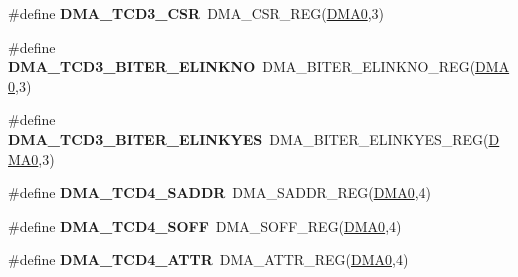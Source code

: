 \begin{DoxyCompactItemize}
\item 
\#define {\bfseries D\+M\+A\+\_\+\+T\+C\+D3\+\_\+\+C\+SR}~D\+M\+A\+\_\+\+C\+S\+R\+\_\+\+R\+EG(\hyperlink{group__DMA__Peripheral__Access__Layer_ga4103044f9ca209772f513dc694513ffb}{D\+M\+A0},3)\hypertarget{group__DMA__Register__Accessor__Macros_ga4cd4b37d23c6c4cd59c8e75abc49a620}{}\label{group__DMA__Register__Accessor__Macros_ga4cd4b37d23c6c4cd59c8e75abc49a620}

\item 
\#define {\bfseries D\+M\+A\+\_\+\+T\+C\+D3\+\_\+\+B\+I\+T\+E\+R\+\_\+\+E\+L\+I\+N\+K\+NO}~D\+M\+A\+\_\+\+B\+I\+T\+E\+R\+\_\+\+E\+L\+I\+N\+K\+N\+O\+\_\+\+R\+EG(\hyperlink{group__DMA__Peripheral__Access__Layer_ga4103044f9ca209772f513dc694513ffb}{D\+M\+A0},3)\hypertarget{group__DMA__Register__Accessor__Macros_ga3b8e5cd5463badcff9d9de63e01ba131}{}\label{group__DMA__Register__Accessor__Macros_ga3b8e5cd5463badcff9d9de63e01ba131}

\item 
\#define {\bfseries D\+M\+A\+\_\+\+T\+C\+D3\+\_\+\+B\+I\+T\+E\+R\+\_\+\+E\+L\+I\+N\+K\+Y\+ES}~D\+M\+A\+\_\+\+B\+I\+T\+E\+R\+\_\+\+E\+L\+I\+N\+K\+Y\+E\+S\+\_\+\+R\+EG(\hyperlink{group__DMA__Peripheral__Access__Layer_ga4103044f9ca209772f513dc694513ffb}{D\+M\+A0},3)\hypertarget{group__DMA__Register__Accessor__Macros_ga78fb2452c2df35600818d0dc072bb308}{}\label{group__DMA__Register__Accessor__Macros_ga78fb2452c2df35600818d0dc072bb308}

\item 
\#define {\bfseries D\+M\+A\+\_\+\+T\+C\+D4\+\_\+\+S\+A\+D\+DR}~D\+M\+A\+\_\+\+S\+A\+D\+D\+R\+\_\+\+R\+EG(\hyperlink{group__DMA__Peripheral__Access__Layer_ga4103044f9ca209772f513dc694513ffb}{D\+M\+A0},4)\hypertarget{group__DMA__Register__Accessor__Macros_ga6cc7248c1aac9b222666d2527404eb72}{}\label{group__DMA__Register__Accessor__Macros_ga6cc7248c1aac9b222666d2527404eb72}

\item 
\#define {\bfseries D\+M\+A\+\_\+\+T\+C\+D4\+\_\+\+S\+O\+FF}~D\+M\+A\+\_\+\+S\+O\+F\+F\+\_\+\+R\+EG(\hyperlink{group__DMA__Peripheral__Access__Layer_ga4103044f9ca209772f513dc694513ffb}{D\+M\+A0},4)\hypertarget{group__DMA__Register__Accessor__Macros_gac5daecfc1646478ddba0208c44bd95de}{}\label{group__DMA__Register__Accessor__Macros_gac5daecfc1646478ddba0208c44bd95de}

\item 
\#define {\bfseries D\+M\+A\+\_\+\+T\+C\+D4\+\_\+\+A\+T\+TR}~D\+M\+A\+\_\+\+A\+T\+T\+R\+\_\+\+R\+EG(\hyperlink{group__DMA__Peripheral__Access__Layer_ga4103044f9ca209772f513dc694513ffb}{D\+M\+A0},4)\hypertarget{group__DMA__Register__Accessor__Macros_gafd8951a9fcbce81a5a61e455663f75b6}{}\label{group__DMA__Register__Accessor__Macros_gafd8951a9fcbce81a5a61e455663f75b6}


\end{DoxyCompactItemize}
